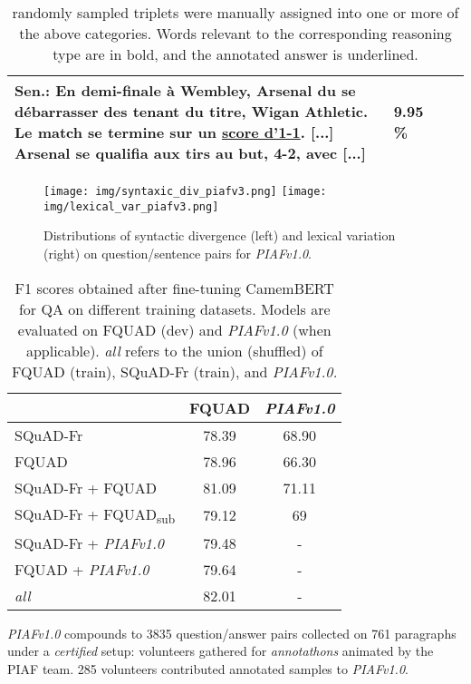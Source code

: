 \documentclass[10pt, a4paper]{article}
\begin{document}
\begin{table*}
\begin{center}
\begin{tabular}{ p{6em} p{13em} p{20em} r}
    Sen.: En demi-finale à Wembley, Arsenal du se débarrasser des tenant du titre, Wigan Athletic. Le match se \textbf{termine sur un \underline{score d'1-1}}. [...] Arsenal se \textbf{qualifia aux tirs au but, 4-2}, avec [...]
    & 9.95 \%\\
    \toprule
    \end{tabular}
\end{center}
\caption{  randomly sampled triplets were manually assigned into  one  or  more  of  the  above  categories. Words relevant  to  the  corresponding reasoning type are in bold, and the annotated answer is underlined.}
\label{tab:manual}
\end{table*}

\begin{figure*}
	\centering
	\texttt{[image: img/syntaxic\_div\_piafv3.png]}
	\texttt{[image: img/lexical\_var\_piafv3.png]}
	\caption{Distributions of syntactic divergence (left) and lexical variation (right) on question/sentence pairs for \emph{PIAFv1.0}.}
	\label{fig:autometrics}
\end{figure*}


\begin{table}
    \centering
    \begin{tabular}{l|c|c}
& FQUAD & \emph{PIAFv1.0} \\
    \hline
    SQuAD-Fr & 78.39 & 68.90 \\\hline
FQUAD &78.96 & 66.30\\\hline
    SQuAD-Fr + FQUAD & 81.09 & 71.11\\\hline
    SQuAD-Fr + FQUAD\textsubscript{sub} & 79.12 & 69 \\
    \hline
    SQuAD-Fr + \emph{PIAFv1.0} & 79.48 & -\\
    \hline
    FQUAD + \emph{PIAFv1.0} & 79.64 & -\\
    \hline
    \emph{all} & 82.01 & -\\
    \end{tabular}
    \caption{F1 scores obtained after fine-tuning CamemBERT for QA on different training datasets. Models are evaluated on FQUAD (dev) and \emph{PIAFv1.0} (when applicable). \emph{all} refers to the union (shuffled) of FQUAD (train), SQuAD-Fr (train), and \emph{PIAFv1.0.}}
    \label{tab:results}
\end{table}

\emph{PIAFv1.0} compounds to 3835 question/answer pairs collected on 761 paragraphs under a \emph{certified} setup: volunteers gathered for \emph{annotathons} animated by the PIAF team. 285 volunteers contributed annotated samples to \emph{PIAFv1.0}.
\end{document}
